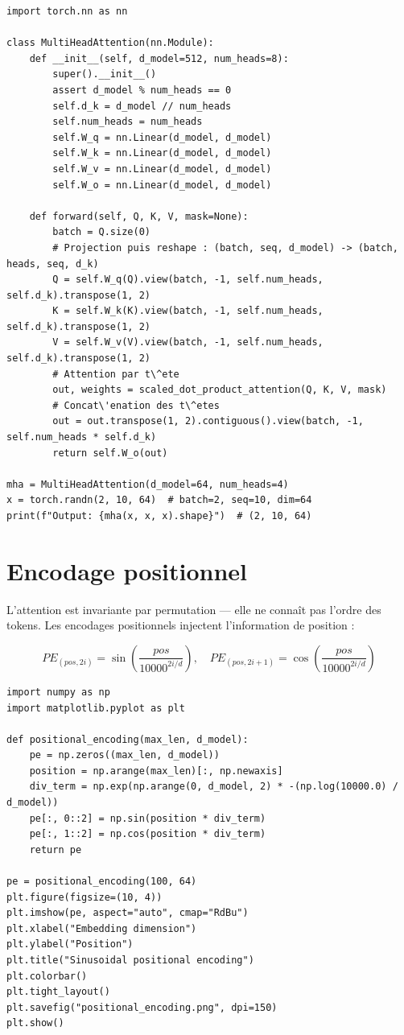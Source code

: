 \begin{verbatim}
import torch.nn as nn

class MultiHeadAttention(nn.Module):
    def __init__(self, d_model=512, num_heads=8):
        super().__init__()
        assert d_model % num_heads == 0
        self.d_k = d_model // num_heads
        self.num_heads = num_heads
        self.W_q = nn.Linear(d_model, d_model)
        self.W_k = nn.Linear(d_model, d_model)
        self.W_v = nn.Linear(d_model, d_model)
        self.W_o = nn.Linear(d_model, d_model)

    def forward(self, Q, K, V, mask=None):
        batch = Q.size(0)
        # Projection puis reshape : (batch, seq, d_model) -> (batch, heads, seq, d_k)
        Q = self.W_q(Q).view(batch, -1, self.num_heads, self.d_k).transpose(1, 2)
        K = self.W_k(K).view(batch, -1, self.num_heads, self.d_k).transpose(1, 2)
        V = self.W_v(V).view(batch, -1, self.num_heads, self.d_k).transpose(1, 2)
        # Attention par t\^ete
        out, weights = scaled_dot_product_attention(Q, K, V, mask)
        # Concat\'enation des t\^etes
        out = out.transpose(1, 2).contiguous().view(batch, -1, self.num_heads * self.d_k)
        return self.W_o(out)

mha = MultiHeadAttention(d_model=64, num_heads=4)
x = torch.randn(2, 10, 64)  # batch=2, seq=10, dim=64
print(f"Output: {mha(x, x, x).shape}")  # (2, 10, 64)
\end{verbatim}

\section{Encodage positionnel}

L'attention est invariante par permutation --- elle ne conna\^it pas l'ordre des tokens. Les encodages positionnels injectent l'information de position :

\[
PE_{(pos, 2i)} = \sin\!\left(\frac{pos}{10000^{2i/d}}\right), \quad
PE_{(pos, 2i+1)} = \cos\!\left(\frac{pos}{10000^{2i/d}}\right)
\]

\begin{verbatim}
import numpy as np
import matplotlib.pyplot as plt

def positional_encoding(max_len, d_model):
    pe = np.zeros((max_len, d_model))
    position = np.arange(max_len)[:, np.newaxis]
    div_term = np.exp(np.arange(0, d_model, 2) * -(np.log(10000.0) / d_model))
    pe[:, 0::2] = np.sin(position * div_term)
    pe[:, 1::2] = np.cos(position * div_term)
    return pe

pe = positional_encoding(100, 64)
plt.figure(figsize=(10, 4))
plt.imshow(pe, aspect="auto", cmap="RdBu")
plt.xlabel("Embedding dimension")
plt.ylabel("Position")
plt.title("Sinusoidal positional encoding")
plt.colorbar()
plt.tight_layout()
plt.savefig("positional_encoding.png", dpi=150)
plt.show()
\end{verbatim}

